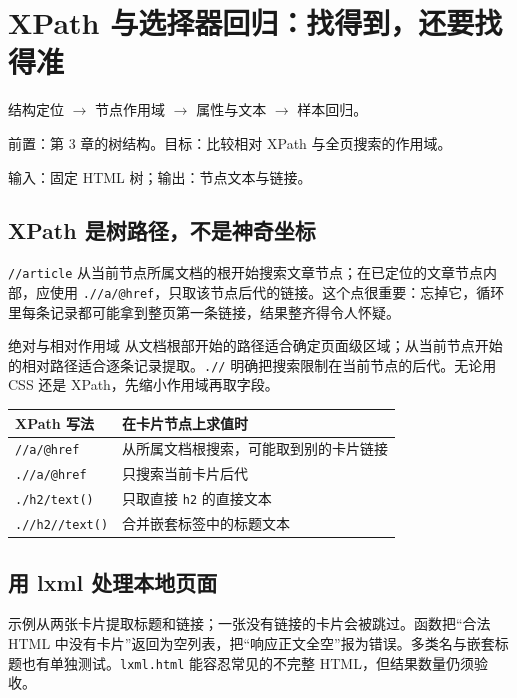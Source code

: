 \chapter{XPath 与选择器回归：找得到，还要找得准}\label{ch:xpath}
\begin{tcolorbox}[title=章首知识地图,colframe=Ink]
结构定位 $\longrightarrow$ 节点作用域 $\longrightarrow$ 属性与文本 $\longrightarrow$ 样本回归。
\end{tcolorbox}

\begin{tcolorbox}[title=学习目标与前置知识,colframe=Ink!65,colback=Ink!2]
前置：第 3 章的树结构。目标：比较相对 XPath 与全页搜索的作用域。\par
输入：固定 HTML 树；输出：节点文本与链接。
\end{tcolorbox}

\section{XPath 是树路径，不是神奇坐标}
\texttt{//article} 从当前节点所属文档的根开始搜索文章节点；在已定位的文章节点内部，应使用 \texttt{.//a/@href}，只取该节点后代的链接。这个点很重要：忘掉它，循环里每条记录都可能拿到整页第一条链接，结果整齐得令人怀疑。

\begin{definition}{绝对与相对作用域}
从文档根部开始的路径适合确定页面级区域；从当前节点开始的相对路径适合逐条记录提取。\texttt{.//} 明确把搜索限制在当前节点的后代。无论用 CSS 还是 XPath，先缩小作用域再取字段。
\end{definition}

\begin{center}\small
\begin{tabularx}{\textwidth}{@{}p{}X@{}}
\toprule
XPath 写法 & 在卡片节点上求值时\\\midrule
\texttt{//a/@href} & 从所属文档根搜索，可能取到别的卡片链接\\
\texttt{.//a/@href} & 只搜索当前卡片后代\\
\texttt{./h2/text()} & 只取直接 \texttt{h2} 的直接文本\\
\texttt{.//h2//text()} & 合并嵌套标签中的标题文本\\
\bottomrule
\end{tabularx}
\end{center}

\section{用 lxml 处理本地页面}
示例从两张卡片提取标题和链接；一张没有链接的卡片会被跳过。函数把“合法 HTML 中没有卡片”返回为空列表，把“响应正文全空”报为错误。多类名与嵌套标题也有单独测试。\texttt{lxml.html} 能容忍常见的不完整 HTML，但结果数量仍须验收。

